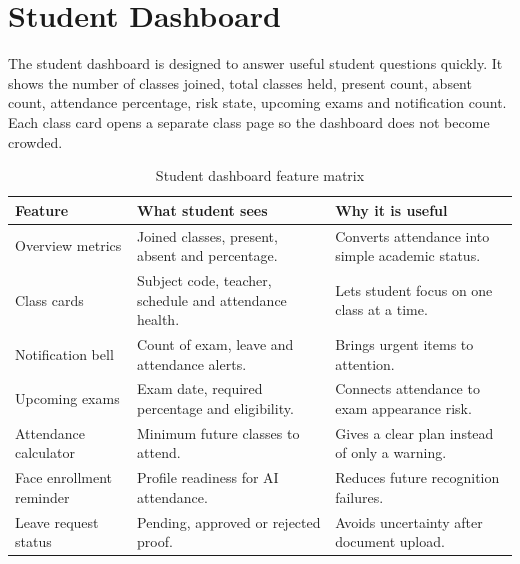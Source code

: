 \section{Student Dashboard}

The student dashboard is designed to answer useful student questions quickly. It shows the number of classes joined, total classes held, present count, absent count, attendance percentage, risk state, upcoming exams and notification count. Each class card opens a separate class page so the dashboard does not become crowded.

\begin{table}[H]
\centering
\caption{Student dashboard feature matrix}
\label{tab:student-feature-matrix}
\begin{tabularx}{\textwidth}{p{3.7cm} X X}
\toprule
\textbf{Feature} & \textbf{What student sees} & \textbf{Why it is useful}\\
\midrule
Overview metrics & Joined classes, present, absent and percentage. & Converts attendance into simple academic status.\\
Class cards & Subject code, teacher, schedule and attendance health. & Lets student focus on one class at a time.\\
Notification bell & Count of exam, leave and attendance alerts. & Brings urgent items to attention.\\
Upcoming exams & Exam date, required percentage and eligibility. & Connects attendance to exam appearance risk.\\
Attendance calculator & Minimum future classes to attend. & Gives a clear plan instead of only a warning.\\
Face enrollment reminder & Profile readiness for AI attendance. & Reduces future recognition failures.\\
Leave request status & Pending, approved or rejected proof. & Avoids uncertainty after document upload.\\
\bottomrule
\end{tabularx}
\end{table}

